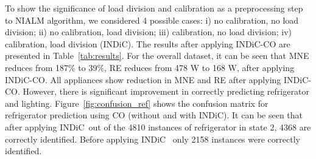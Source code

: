 \documentclass[conference]{IEEEtran}
\newcommand{\figref}[1]{Figure~\ref{#1}}
\newcommand{\tabref}[1]{Table~\ref{#1}}
\newcommand{\indic}{INDiC~}
\newcommand{\indicns}{INDiC}
\begin{document}
\noindent To show the significance of load division and calibration as a preprocessing step to NIALM algorithm, we considered 4 possible cases:  i) no calibration, no load division; ii) no calibration, load division; iii) calibration, no load division; iv) calibration, load division (\indicns). The results after applying \indicns-CO are presented in \tabref{tab:results}. For the overall dataset, it can be seen that MNE reduces from 187\% to 39\%, RE reduces from 478 W to 168 W, after applying \indicns-CO. All appliances show reduction in MNE and RE after applying \indicns-CO. However, there is significant improvement in correctly predicting refrigerator and lighting. \figref{fig:confusion_ref} shows the confusion matrix for refrigerator prediction using CO (without and with \indicns). It can be seen that after applying \indic out of the 4810 instances of refrigerator in state 2, 4368 are correctly identified. Before applying \indic
only 2158 instances were correctly identified.
%

\end{document}
